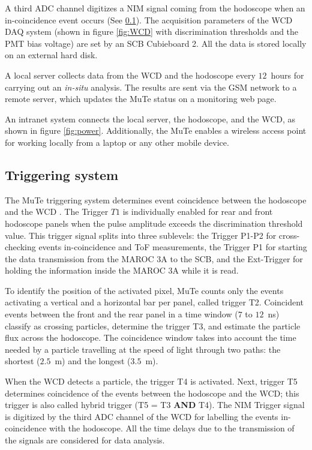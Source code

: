 \documentclass[letterpaper,11pt]{article}
\begin{document}
A third ADC channel digitizes a NIM signal coming from the hodoscope when an in-coincidence event occurs (See \ref{trigger}). The acquisition parameters of the WCD DAQ system (shown in figure \ref{fig:WCD} with discrimination thresholds and the PMT bias voltage) are set by an SCB Cubieboard 2. All the data is stored locally on an external hard disk. 

A local server collects data from the WCD and the hodoscope every $12$~hours for carrying out an \textit{in-situ} analysis. The results are sent via the GSM network to a remote server, which updates the MuTe status on a monitoring web page.

An intranet system connects the local server, the hodoscope, and the WCD, as shown in figure \ref{fig:power}. Additionally, the MuTe enables a wireless access point for working locally from a laptop or any other mobile device.

\subsection{Triggering system}
\label{trigger}
The MuTe triggering system determines event coincidence between the hodoscope and the WCD \cite{PenaRodriguez2019}. The Trigger $T1$ is individually enabled for rear and front hodoscope panels when the pulse amplitude exceeds the discrimination threshold value. This trigger signal splits into three sublevels: the Trigger P1-P2 for cross-checking events in-coincidence and ToF measurements, the Trigger P1 for starting the data transmission from the MAROC 3A to the SCB, and the Ext-Trigger for holding the information inside the MAROC 3A while it is read.

To identify the position of the activated pixel, MuTe counts only the events activating a vertical and a horizontal bar per panel, called trigger T2. Coincident events between the front and the rear panel in a time window ($7$ to $12$~ns) classify as crossing particles, determine the trigger T3, and estimate the particle flux across the hodoscope. The coincidence window takes into account the time needed by a particle travelling at the speed of light through two paths: the shortest ($2.5$~m) and the longest ($3.5$~m).

When the WCD detects a particle, the trigger T4 is activated. Next, trigger T5 determines coincidence of the events between the hodoscope and the WCD; this trigger is also called hybrid trigger (T5 = T3 \textbf{AND} T4). The NIM Trigger signal is digitized by the third ADC channel of the WCD for labelling the events in-coincidence with the hodoscope. All the time delays due to the transmission of the signals are considered for data analysis.
\end{document}
